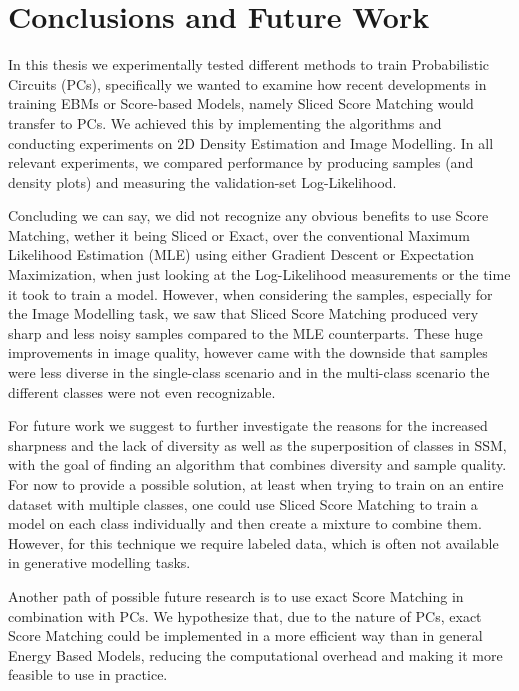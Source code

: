 \chapter{Conclusions and Future Work}
\label{cha:conclusions}

In this thesis we experimentally tested different methods to train Probabilistic Circuits (PCs), specifically
we wanted to examine how recent developments in training EBMs or Score-based Models, namely 
Sliced Score Matching would transfer to PCs. 
We achieved this by implementing the algorithms and conducting experiments on 2D Density Estimation
and Image Modelling. In all relevant experiments, we compared performance by producing samples 
(and density plots) and measuring the validation-set Log-Likelihood.

Concluding we can say, we did not recognize any obvious benefits to use Score Matching, wether it being Sliced 
or Exact, over the conventional Maximum Likelihood Estimation (MLE) using either Gradient Descent 
or Expectation Maximization, when just looking at the Log-Likelihood measurements or the time it 
took to train a model. 
However, when considering the samples, especially for the Image Modelling task, we saw that Sliced Score Matching
produced very sharp and less noisy samples compared to the MLE counterparts.
These huge improvements in image quality, however came with the downside that 
samples were less diverse in the single-class scenario and in the multi-class scenario
the different classes were not even recognizable.

For future work we suggest to further investigate the reasons for the increased sharpness and the 
lack of diversity as well as the superposition of classes in SSM, with the goal of finding 
an algorithm that combines diversity and sample quality. 
For now to provide a possible solution, at least when trying to train on an entire dataset with 
multiple classes, one could use Sliced Score Matching to train a model on each class individually and 
then create a mixture to combine them. However, for this technique we require labeled data, which is 
often not available in generative modelling tasks.

Another path of possible future research is to use exact Score Matching in combination with
PCs. We hypothesize that, due to the nature of PCs, exact Score Matching 
could be implemented in a more efficient way than in general Energy Based Models, reducing 
the computational overhead and making it more feasible to use in practice.